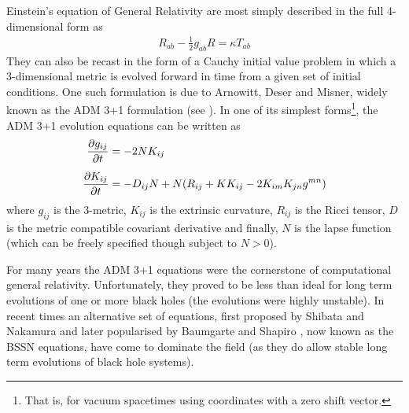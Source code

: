 \documentclass[a4paper,12pt]{article}
\numberwithin{equation}{section}%
\begin{document}
Einstein's equation of General Relativity are most simply described in the full 4-dimensional
form as
\begin{align}
   R_{ab} - \frac{1}{2} g_{ab} R = \kappa T_{ab}
\end{align}
They can also be recast in the form of a Cauchy initial value problem in which a
3-dimensional metric is evolved forward in time from a given set of initial conditions. One
such formulation is due to Arnowitt, Deser and Misner, widely known as the ADM 3+1
formulation (see \cite{mtw:1973-01}). In one of its simplest forms\footnote{That is, for
vacuum spacetimes using coordinates with a zero shift vector.}, the ADM 3+1 evolution
equations can be written as
\begin{align}
   \frac{\partial g_{i j}}{\partial t} &= -2 N K_{i j}\\[5pt]
   \frac{\partial K_{i j}}{\partial t} &= -D_{i j}{N} + N (R_{i j} + {K} K_{i j} - 2 K_{i m} K_{j n} g^{m n})
\end{align}
where $g_{ij}$ is the 3-metric, $K_{ij}$ is the extrinsic curvature, $R_{ij}$ is the Ricci
tensor, $D$ is the metric compatible covariant derivative and finally, $N$ is the lapse
function (which can be freely specified though subject to $N>0$).

For many years the ADM 3+1 equations were the cornerstone of computational general
relativity. Unfortunately, they proved to be less than ideal for long term evolutions of one
or more black holes (the evolutions were highly unstable). In recent times an alternative
set of equations, first proposed by Shibata and Nakamura \cite{shibata:1995-01} and later
popularised by Baumgarte and Shapiro \cite{baumgarte:1998-01}, now known as the BSSN
equations, have come to dominate the field (as they do allow stable long term evolutions of
black hole systems).
\end{document}
